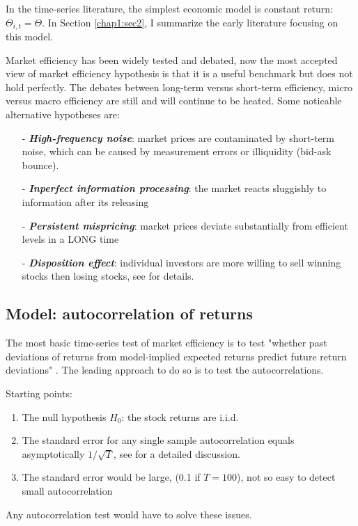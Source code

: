 In the time-series literature, the simplest economic model is constant return: $\Theta_{i,t}=\Theta$. In Section \ref{chap1:sec2}, I summarize
the early literature focusing on this model.

Market efficiency has been widely tested and debated, now the most accepted view of market efficiency hypothesis is that
it is a useful benchmark but does not hold perfectly. The debates between long-term versus short-term efficiency, micro versus
macro efficiency are still and will continue to be heated. Some noticable alternative hypotheses are:
\begin{enumerate}
    \item[-] \textbf{\textit{High-frequency noise}}: market prices are contaminated by short-term noise, which can be caused by measurement errors or illiquidity (bid-ask bounce).
    \item[-] \textbf{\textit{Inperfect information processing}}: the market reacts sluggishly to information after its releasing
    \item[-] \textbf{\textit{Persistent mispricing}}: market prices deviate substantially from efficient levels in a LONG time
    \item[-] \textbf{\textit{Disposition effect}}: individual investors are more willing to sell winning stocks then losing stocks, see \citet{shefrin1985disposition} for details.
\end{enumerate}

\subsection{Model: autocorrelation of returns}
The most basic time-series test of market efficiency is to test "whether past deviations of returns from model-implied expected returns
predict future return deviations" \citep[See][p.~124]{campbell2017financial}. The leading approach to do so is to test the autocorrelations.

Starting points:
\begin{enumerate}
    \item The null hypothesis $H_0$: the stock returns are i.i.d. 
    \item The standard error for any single sample autocorrelation equals asymptotically $1/\sqrt{T}$, see \citet{box1970distribution} for a detailed discussion.
    \item The standard error would be large, (0.1 if $T=100$), not so easy to detect small autocorrelation
\end{enumerate}
Any autocorrelation test would have to solve these issues.

